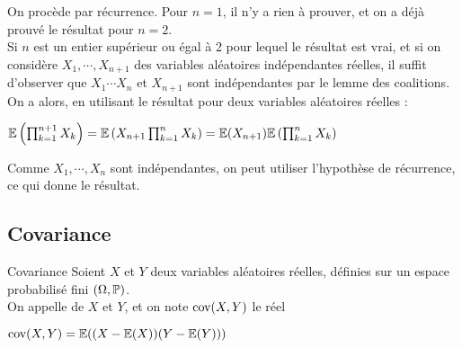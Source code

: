 \documentclass[12pt,a4paper]{report}
\begin{document}
\begin{demo}{}
On procède par récurrence. Pour $n=1$, il n'y a rien à prouver, et on a déjà prouvé le résultat pour $n=2$. \\

Si $n$ est un entier supérieur ou égal à 2 pour lequel le résultat est vrai, et si on considère $X_1,\cdots,X_{n+1}$ des variables aléatoires indépendantes réelles, il suffit d'observer que $X_1\cdots X_n$ et $X_{n+1}$ sont indépendantes par le lemme des coalitions. On a alors, en utilisant le résultat pour deux variables aléatoires réelles :
\begin{center}
$\mathbb{E}\left(\prod_{k=1}^{n+1} X_k\right) = \mathbb{E}\left(X_{n+1} \prod_{k=1}^n X_k\right) = \mathbb{E}(X_{n+1}) \mathbb{E}\left(\prod_{k=1}^n X_k\right)$
\end{center}

Comme $X_1,\cdots,X_n$ sont indépendantes, on peut utiliser l'hypothèse de récurrence, ce qui donne le résultat.
\end{demo}

\subsection{Covariance}

\begin{definition}{Covariance}{}
Soient $X$ et $Y$ deux variables aléatoires réelles, définies sur un espace probabilisé fini $(\Omega, \mathbb{P})$. \\

On appelle  de $X$ et $Y$, et on note $\text{cov}(X,Y)$ le réel
\begin{center}
$\text{cov}(X,Y) = \mathbb{E}((X-\mathbb{E}(X))(Y-\mathbb{E}(Y)))$
\end{center}
\end{definition}
\end{document}
